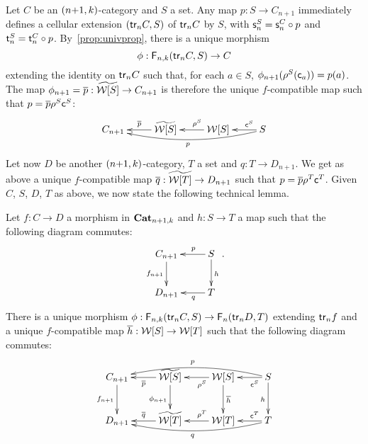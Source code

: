 \begin{paragr}\label{paragr:addproperties}
  Let $C$ be an $(n{+}1,k)$-category and $S$ a set. Any map
  $p:S\to C_{n+1}$ immediately defines a cellular extension $(\mathsf{tr}_{n} C,S)$ of
  $\mathsf{tr}_{n} C$ by $S$, with $\mathsf{s}_{n}^S=\mathsf{s}_{n}^C\circ p$ and $\mathsf{t}_{n}^S=\mathsf{t}_{n}^C\circ p$. By~\cref{prop:univprop}, there is a unique
  morphism
  \[\phi:\mathsf{F}_{n,k}(\mathsf{tr}_{n}C,S)\to C\]
  extending the identity on $\mathsf{tr}_{n} C$ such that, for each $a\in S$,
  $\phi_{n+1}(\rho^{S}(\mathsf{c}_{a}))=p(a)$. The map
  $\phi_{n+1}=\overline{p}:\widetilde{\mathcal{W}[S]}\to C_{n+1}$ is therefore the unique
 $f$-compatible map such that $p=\overline{p}\rho^{S}\mathsf{c}^{S}$:
  \[
    \xymatrix{C_{n+1} & \wtxeq S\ar[l]_{\extend{p}} & \wtx S
      \ar[l]_(.4){\cans{S}} & S\ar[l]_(.3){\finc{S}} \ar@/^1em/[lll]^p}
  \]
 Let now $D$ be another $(n{+}1,k)$-category, $T$ a set and
 $q:T\to D_{n+1}$. We get as above a unique $f$-compatible map
 $\overline{q}:\widetilde{\mathcal{W}[T]}\to D_{n+1}$ such that $p=\overline{p}\rho^{T}\mathsf{c}^{T}$. Given $C$, $S$, $D$, $T$ as above, we now state the following
 technical lemma.
 \begin{lemma}\label{lemma:tech}
   Let $f:C\to D$ a morphism in $\mathbf{Cat}_{n+1,k}$ and  $h:S\to T$ a
   map such that the following diagram commutes:
   \[
     \xymatrix{C_{n+1} \ar[d]_{f_{n+1}}& S\ar[d]^h\ar[l]_(.4){p}\\
       D_{n+1} & T\ar[l]^(.4){q}}.
   \]
   There is a  unique morphism $\phi:\mathsf{F}_{n,k}(\mathsf{tr}_{n} C,S)\to \mathsf{F}_{n}(\mathsf{tr}_{n} D,T)$ extending $\mathsf{tr}_{n} f$ and a unique $f$-compatible map $\overline{h}:\mathcal{W}[S]\to\mathcal{W}[T]$ such that the following diagram commutes:
    \begin{equation}
     \label{eq:tech}
     \xymatrix{
     C_{n+1} \ar[d]_{f_{n+1}}& \wtxeq S\ar[l]^{\extend{p}}\ar[d]_{\phi_{n+1}} & \wtx S
      \ar[l]^(.4){\cans{S}}\ar[d]^{\extend h} & S\ar[l]^(.3){\finc{S}}
      \ar@/_1em/[lll]_p\ar[d]_h\\
      D_{n+1} & \wtxeq T\ar[l]_{\extend{q}} & \wtx T
      \ar[l]_(.4){\cans{T}} & T\ar[l]_(.3){\finc{T}} \ar@/^1em/[lll]^q}
     \end{equation}
   \end{lemma}
 
  
\end{paragr}
  
 

 
 








 
 
 
